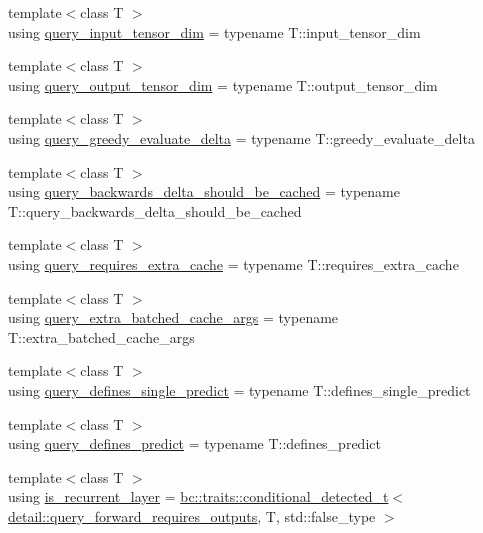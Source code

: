 \begin{DoxyCompactItemize}
\item 
{\footnotesize template$<$class T $>$ }\\using \hyperlink{namespacebc_1_1nn_1_1detail_a4bdf240452d0d96d1f433e7f0f5dd3e7}{query\+\_\+input\+\_\+tensor\+\_\+dim} = typename T\+::input\+\_\+tensor\+\_\+dim
\item 
{\footnotesize template$<$class T $>$ }\\using \hyperlink{namespacebc_1_1nn_1_1detail_aa16772b430fc14eb1bf4b82ad6f679fd}{query\+\_\+output\+\_\+tensor\+\_\+dim} = typename T\+::output\+\_\+tensor\+\_\+dim
\item 
{\footnotesize template$<$class T $>$ }\\using \hyperlink{namespacebc_1_1nn_1_1detail_aee17a95f5bdf1a2903f755a7de7ac632}{query\+\_\+greedy\+\_\+evaluate\+\_\+delta} = typename T\+::greedy\+\_\+evaluate\+\_\+delta
\item 
{\footnotesize template$<$class T $>$ }\\using \hyperlink{namespacebc_1_1nn_1_1detail_a9348aef49158fa3a605fcc4eb9387c87}{query\+\_\+backwards\+\_\+delta\+\_\+should\+\_\+be\+\_\+cached} = typename T\+::query\+\_\+backwards\+\_\+delta\+\_\+should\+\_\+be\+\_\+cached
\item 
{\footnotesize template$<$class T $>$ }\\using \hyperlink{namespacebc_1_1nn_1_1detail_a7cfff1896ea5ef55f6410bb7c6ff3bf3}{query\+\_\+requires\+\_\+extra\+\_\+cache} = typename T\+::requires\+\_\+extra\+\_\+cache
\item 
{\footnotesize template$<$class T $>$ }\\using \hyperlink{namespacebc_1_1nn_1_1detail_a0e5abd56399f408e7b9dc5bf91d70f6e}{query\+\_\+extra\+\_\+batched\+\_\+cache\+\_\+args} = typename T\+::extra\+\_\+batched\+\_\+cache\+\_\+args
\item 
{\footnotesize template$<$class T $>$ }\\using \hyperlink{namespacebc_1_1nn_1_1detail_aa141b344c5a584e16057d62b8b9cba6f}{query\+\_\+defines\+\_\+single\+\_\+predict} = typename T\+::defines\+\_\+single\+\_\+predict
\item 
{\footnotesize template$<$class T $>$ }\\using \hyperlink{namespacebc_1_1nn_1_1detail_ad39fb4d3bf636fece8bd359a3bca9579}{query\+\_\+defines\+\_\+predict} = typename T\+::defines\+\_\+predict
\item 
{\footnotesize template$<$class T $>$ }\\using \hyperlink{namespacebc_1_1nn_1_1detail_a05af00abf685410896e4af7ebfdc3929}{is\+\_\+recurrent\+\_\+layer} = \hyperlink{namespacebc_1_1traits_a1a6d378947ec32acd457890854bcd592}{bc\+::traits\+::conditional\+\_\+detected\+\_\+t}$<$ \hyperlink{namespacebc_1_1nn_1_1detail_a10314a67405b06863c6384de87e36bad}{detail\+::query\+\_\+forward\+\_\+requires\+\_\+outputs}, T, std\+::false\+\_\+type $>$
\end{DoxyCompactItemize}


